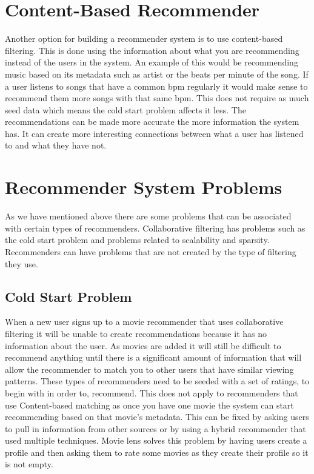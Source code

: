     \section{Content-Based Recommender}
        Another option for building a recommender system is to use content-based filtering. This is done using the information about what you are recommending instead of the users in the system. An example of this would be recommending music based on its metadata such as artist or the beats per minute of the song. If a user listens to songs that have a common bpm regularly it would make sense to recommend them more songs with that same bpm. This does not require as much seed data which means the cold start problem affects it less. The recommendations can be made more accurate the more information the system has. It can create more interesting connections between what a user has listened to and what they have not. 


    \section{Recommender System Problems}\label{sec:RecommenderSystemProblems}
        As we have mentioned above there are some problems that can be associated with certain types of recommenders. Collaborative filtering has problems such as the cold start problem and problems related to scalability and sparsity. Recommenders can have problems that are not created by the type of filtering they use.  

        \subsection{Cold Start Problem}
            When a new user signs up to a movie recommender that uses collaborative filtering it will be unable to create recommendations because it has no information about the user. As movies are added it will still be difficult to recommend anything until there is a significant amount of information that will allow the recommender to match you to other users that have similar viewing patterns. These types of recommenders need to be seeded with a set of ratings, to begin with in order to, recommend. This does not apply to recommenders that use Content-based matching as once you have one movie the system can start recommending based on that movie's metadata. This can be fixed by asking users to pull in information from other sources or by using a hybrid recommender that used multiple techniques. Movie lens \cite{10.1145/2827872} solves this problem by having users create a profile and then asking them to rate some movies as they create their profile so it is not empty.

